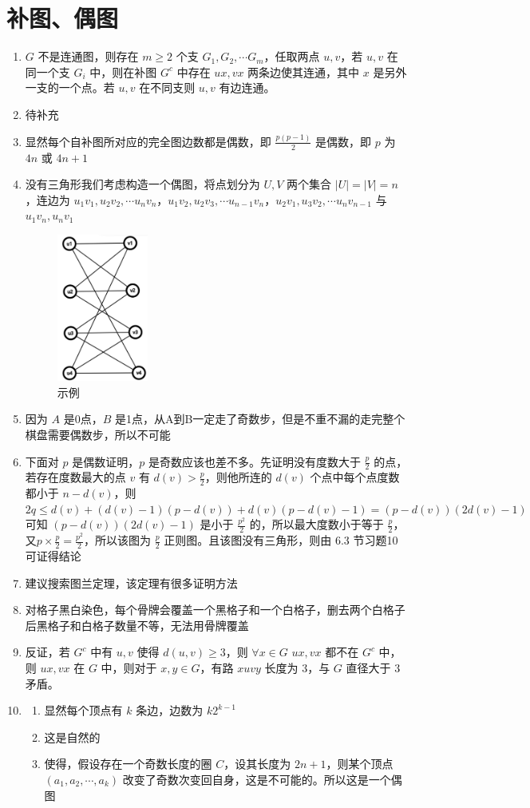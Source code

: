 \documentclass[../../main.tex]{subfiles}
\begin{document}
\section{补图、偶图}
\begin{enumerate}
    \item $G$ 不是连通图，则存在 $m \ge 2$ 个支 $G_1,G_2,\cdots G_m$，任取两点 $u,v$，若 $u,v$ 在同一个支 $G_i$ 中，则在补图 $G^{c}$ 中存在 $ux,vx$ 两条边使其连通，其中 $x$ 是另外一支的一个点。若 $u,v$ 在不同支则 $u,v$ 有边连通。
    \item 待补充
    \item 显然每个自补图所对应的完全图边数都是偶数，即 $\frac{p(p-1)}{2}$ 是偶数，即 $p$ 为 $4n$ 或 $4n+1$
    \item 没有三角形我们考虑构造一个偶图，将点划分为 $U,V$ 两个集合 $|U|=|V|=n$，连边为 $u_1v_1,u_2v_2,\cdots u_nv_n$，$u_1v_2,u_2v_3,\cdots u_{n-1}v_n$，$u_2v_1,u_3v_2,\cdots u_nv_{n-1}$ 与 $u_1v_n,u_nv_1$ 
    \begin{figure}[htpbp]
        \centering
        \includegraphics[width=3cm]{graph01}%
        \caption{示例}
    \end{figure}
    \item 因为 $A$ 是0点，$B$ 是1点，从A到B一定走了奇数步，但是不重不漏的走完整个棋盘需要偶数步，所以不可能
    \item 下面对 $p$ 是偶数证明，$p$ 是奇数应该也差不多。先证明没有度数大于 $\frac{p}{2}$ 的点，若存在度数最大的点 $v$ 有 $d(v) > \frac{p}{2}$，则他所连的 $d(v)$ 个点中每个点度数都小于 $n-d(v)$，则 $2q \le d(v)+(d(v)-1)(p-d(v))+d(v)(p-d(v)-1)=(p-d(v))(2d(v)-1)$ 可知 $(p-d(v))(2d(v)-1)$ 是小于 $\frac{p^2}{2}$ 的，所以最大度数小于等于 $\frac{p}{2}$，又$p\times \frac{p}{2}=\frac{p^2}{2}$，所以该图为 $\frac{p}{2}$ 正则图。且该图没有三角形，则由 6.3 节习题10可证得结论
    \item 建议搜索图兰定理，该定理有很多证明方法
    \item 对格子黑白染色，每个骨牌会覆盖一个黑格子和一个白格子，删去两个白格子后黑格子和白格子数量不等，无法用骨牌覆盖
    \item 反证，若 $G^c$ 中有 $u,v$ 使得 $d(u,v) \ge 3$，则 $\forall x \in G$ $ux,vx$ 都不在 $G^{c}$ 中，则 $ux,vx$ 在 $G$ 中，则对于 $x,y \in G$，有路 $xuvy$ 长度为 $3$，与 $G$ 直径大于 $3$ 矛盾。
    \item \begin{enumerate}
        \item 显然每个顶点有 $k$ 条边，边数为 $k2^{k-1}$
        \item 这是自然的
        \item 使得，假设存在一个奇数长度的圈 $C$，设其长度为 $2n+1$，则某个顶点 $(a_1,a_2,\cdots,a_k)$ 改变了奇数次变回自身，这是不可能的。所以这是一个偶图
    \end{enumerate}
\end{enumerate}
\end{document}
